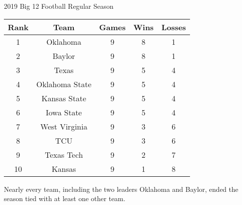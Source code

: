 {\begin{figg}{2019 Big 12 Football Regular Season}{}
    \centering
    \begin{tabular}{| c | c | c | c | c |}
        \hline
        Rank & Team & Games & Wins & Losses\\ \hline
        1 & Oklahoma & 9 & 8 & 1\\ \hline
        2 & Baylor & 9 & 8 & 1\\ \hline
        3 & Texas & 9 & 5 & 4\\ \hline
        4 & Oklahoma State & 9 & 5 & 4\\ \hline
        5 & Kansas State & 9 & 5 & 4\\ \hline
        6 & Iowa State & 9 & 5 & 4\\ \hline
        7 & West Virginia & 9 & 3 & 6\\ \hline
        8 & TCU & 9 & 3 & 6\\ \hline
        9 & Texas Tech & 9 & 2 & 7\\ \hline
        10 & Kansas & 9 & 1 & 8\\ \hline
    \end{tabular}
\end{figg}

Nearly every team, including the two leaders Oklahoma and Baylor, ended the season tied with at least one other team. 




}